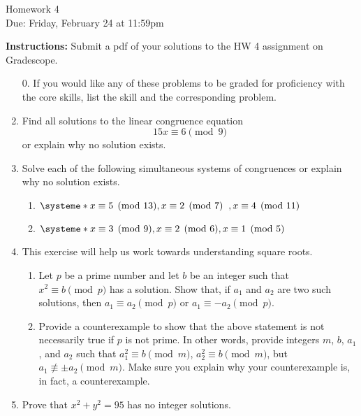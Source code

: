 \documentclass[12pt]{article}
\begin{document}
\begin{center}
{\Large Homework 4}\\
Due: Friday,  February 24 at 11:59pm\\


\end{center}
{\bf Instructions:} Submit a pdf of your solutions to the HW 4 assignment on Gradescope. 



\begin{enumerate}
\item[0.] If you would like any of these problems to be graded for proficiency with the core skills, list the skill and the corresponding problem. 
\item Find all solutions to the linear congruence equation $$15x\equiv 6\pmod{9}$$ or explain why no solution exists.

\item Solve each of the following simultaneous systems of congruences or explain
why no solution exists.
\begin{enumerate}
\item $\systeme*{x\equiv 5\pmod{13}, x\equiv 2\pmod{7}\;\;, x\equiv 4 \pmod{11}}$
\item $\systeme*{x\equiv 3\pmod{9}, x\equiv 2\pmod 6, x\equiv 1\pmod{5}}$
\end{enumerate}

\item This exercise will help us work towards understanding square roots. 
\begin{enumerate}
\item Let $p$ be a prime number and let $b$ be an integer such that $x^2\equiv b\pmod{p}$ has a solution.  Show that,  if $a_1$ and $a_2$ are two such solutions, then $a_1\equiv a_2\pmod{p}$ or $a_1\equiv -a_2\pmod{p}$. 
\item Provide a counterexample to show that the above statement is not necessarily true if $p$ is not prime. In other words, provide integers $m$, $b$, $a_1$, and $a_2$ such that $a_1^2\equiv b\pmod{m}$, $a_2^2\equiv b\pmod{m}$, but $a_1\not \equiv \pm a_2 \pmod{m}$. Make sure you explain why your counterexample is, in fact, a counterexample. 
\end{enumerate}

\item Prove that $x^2+y^2=95$ has no integer solutions.

\end{enumerate}
\end{document}
